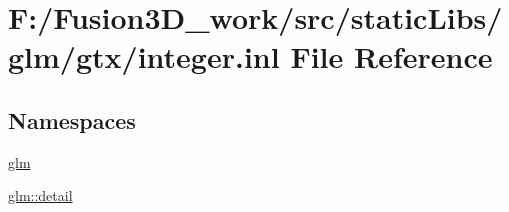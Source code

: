 \hypertarget{gtx_2integer_8inl}{}\section{F\+:/\+Fusion3\+D\+\_\+work/src/static\+Libs/glm/gtx/integer.inl File Reference}
\label{gtx_2integer_8inl}
\subsection*{Namespaces}
\begin{DoxyCompactItemize}
\item 
 \hyperlink{namespaceglm}{glm}
\item 
 \hyperlink{namespaceglm_1_1detail}{glm\+::detail}
\end{DoxyCompactItemize}
